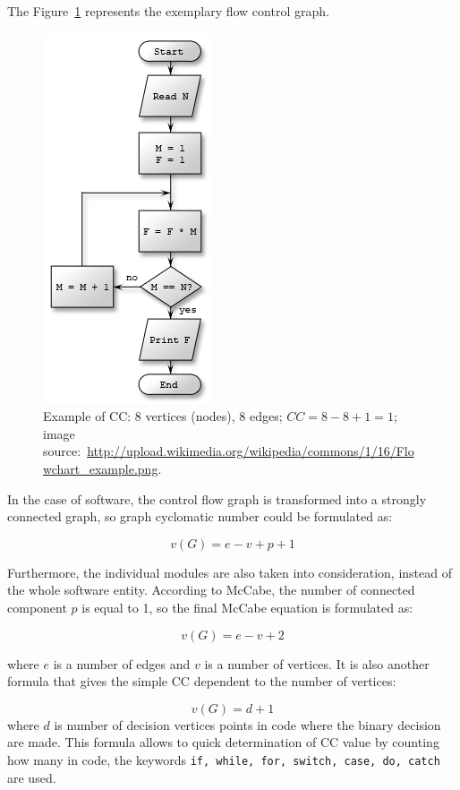 The Figure~\ref{fig:cyclomatic_complexity} represents the exemplary flow control graph.

\begin{figure}[h!]
	\centering
	\includegraphics[scale=0.5]{img/cyclomatic_complexity.png} 
	\caption{Example of \ac{CC}: 8 vertices (nodes), 8 edges; $CC = 8 - 8 + 1 = 1$; image source:~\url{http://upload.wikimedia.org/wikipedia/commons/1/16/Flowchart_example.png}.}		
	\label{fig:cyclomatic_complexity}
\end{figure}

In the case of software, the control flow graph is transformed into a strongly connected graph, so graph cyclomatic number could be formulated as:

\begin{equation}
v(G) = e - v + p + 1
\end{equation} 

Furthermore, the individual modules are also taken into consideration, instead of the whole software entity. According to McCabe, the number of connected component $p$ is equal to 1, so the final McCabe equation is formulated as:

\begin{equation}
v(G) = e - v + 2
\end{equation}

where $e$ is a number of edges and $v$ is a number of vertices. It is also another formula that gives the simple \ac{CC} dependent to the number of vertices:

\begin{equation}
v(G) = d + 1
\end{equation}
where $d$ is number of decision vertices points in code where the binary decision are made. This formula allows to quick determination of \ac{CC} value by counting how many in code, the keywords \texttt{if, while, for, switch, case, do, catch} are used. 

